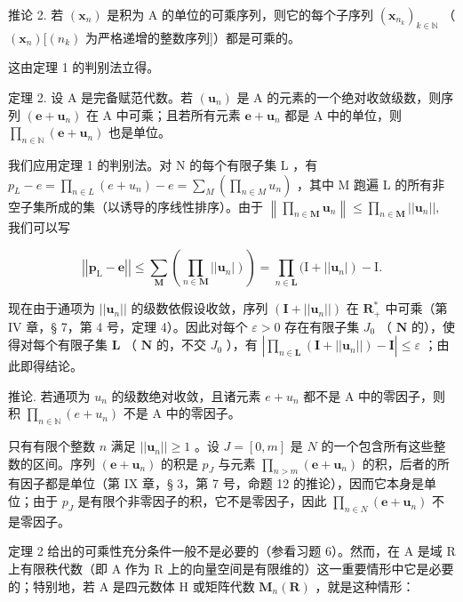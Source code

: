 推论 2. 若 \((\pmb{x}_n)\) 是积为 A 的单位的可乘序列，则它的每个子序列 \((\pmb{x}_{n_k})_{k\in \mathbb{N}}\) （ \((\pmb{x}_n)[(n_k)\) 为严格递增的整数序列{]}）都是可乘的。

这由定理 1 的判别法立得。

定理 2. 设 A 是完备赋范代数。若 \((\pmb{u}_n)\) 是 A 的元素的一个绝对收敛级数，则序列 \((\pmb{e} + \pmb{u}_n)\) 在 A 中可乘；且若所有元素 \(\pmb{e} + \pmb{u}_n\) 都是 A 中的单位，则 \(\prod_{n\in \mathbb{N}}(\pmb {e} + \pmb{u}_n)\) 也是单位。

我们应用定理 1 的判别法。对 N 的每个有限子集 L ，有 \(p_{L} - e = \prod_{n \in L} (e + u_n) - e = \sum_{M} \left( \prod_{n \in M} u_n \right)\) ，其中 M 跑遍 L 的所有非空子集所成的集（以诱导的序线性排序）。由于 \(\left\| \prod_{n\in \mathbf{M}}\pmb {u}_n\right\| \leqslant \prod_{n\in \mathbf{M}}||\pmb {u}_n||,\) 我们可以写

\[
\left| \left| \boldsymbol {p} _ {\mathrm{L}} - \boldsymbol {e} \right| \right| \leqslant \sum_ {\mathbf {M}} \left(\prod_ {n \in \mathbf {M}} \left| \left| \boldsymbol {u} _ {n} \right|\right)\right) = \prod_ {n \in \mathbf {L}} (\mathrm{I} + \left| \left| \boldsymbol {u} _ {n} \right|\right) - \mathrm{I}.
\]

现在由于通项为 \(||\boldsymbol{u}_n||\) 的级数依假设收敛，序列 \((\mathbf{I} + ||\boldsymbol{u}_n||)\) 在 \(\mathbf{R}_+^*\) 中可乘（第 IV 章，§ 7，第 4 号，定理 4）。因此对每个 \(\varepsilon > 0\) 存在有限子集 \(J_0\) （ \(\mathbf{N}\) 的），使得对每个有限子集 \(\mathbf{L}\) （ \(\mathbf{N}\) 的，不交 \(J_0\) ），有 \(\left| \prod_{n \in \mathbf{L}} (\mathbf{I} + ||\boldsymbol{u}_n||) - \mathbf{I} \right| \leqslant \varepsilon\) ；由此即得结论。

推论. 若通项为 \(u_{n}\) 的级数绝对收敛，且诸元素 \(e + u_{n}\) 都不是 A 中的零因子，则积 \(\prod_{n \in \mathbb{N}} (e + u_{n})\) 不是 A 中的零因子。

只有有限个整数 \(n\) 满足 \(||\boldsymbol{u}_n|| \geqslant 1\) 。设 \(J = [0, m]\) 是 \(N\) 的一个包含所有这些整数的区间。序列 \((\boldsymbol{e} + \boldsymbol{u}_n)\) 的积是 \(p_J\) 与元素 \(\prod_{n > m} (\boldsymbol{e} + \boldsymbol{u}_n)\) 的积，后者的所有因子都是单位（第 IX 章，§ 3，第 7 号，命题 12 的推论），因而它本身是单位；由于 \(p_J\) 是有限个非零因子的积，它不是零因子，因此 \(\prod_{n \in N} (\boldsymbol{e} + \boldsymbol{u}_n)\) 不是零因子。

定理 2 给出的可乘性充分条件一般不是必要的（参看习题 6）。然而，在 A 是域 R 上有限秩代数（即 A 作为 R 上的向量空间是有限维的）这一重要情形中它是必要的；特别地，若 A 是四元数体 H 或矩阵代数 \(\mathbf{M}_n(\mathbf{R})\) ，就是这种情形：

